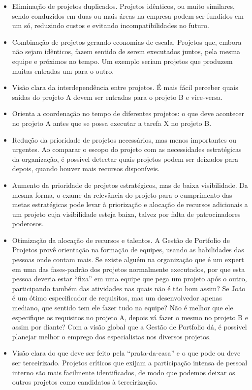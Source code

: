 \documentclass[12pt,a4paper,ruledheader,tocpage=prefix,floatnumber=continuous,pagestart=folhaderosto,font=times]{abnt}
\begin{document}
\begin{itemize}
 \item Eliminação de projetos duplicados. Projetos idênticos, ou muito similares, sendo conduzidos em duas ou mais áreas na empresa podem ser fundidos em um só, reduzindo custos e evitando incompatibilidades no futuro.
 \item Combinação de projetos gerando economias de escala. Projetos que, embora não sejam idênticos, fazem sentido de serem executados juntos, pela mesma equipe e próximos no tempo. Um exemplo seriam projetos que produzem muitas entradas um para o outro.
 \item Visão clara da interdependência entre projetos. É mais fácil perceber quais saídas do projeto A devem ser entradas para o projeto B e vice-versa.
 \item Orienta a coordenação no tempo de diferentes projetos: o que deve acontecer no projeto A antes que se possa executar a tarefa X no projeto B.
 \item Redução da prioridade de projetos necessários, mas menos importantes ou urgentes. Ao comparar o escopo do projeto com as necessidades estratégicas da organização, é possível detectar quais projetos podem ser deixados para depois, quando houver mais recursos disponíveis.
 \item Aumento da prioridade de projetos estratégicos, mas de baixa visibilidade. Da mesma forma, o exame da relevância do projeto para o cumprimento das metas estratégicas pode levar à priorização e alocação de recursos adicionais a um projeto cuja visibilidade esteja baixa, 
talvez por falta de patrocinadores poderosos.
 \item Otimização da alocação de recursos e talentos. A Gestão de Portfolio de Projetos provê orientação na formação de equipes, usando as habilidades das pessoas onde contam mais. Se existe alguém na organização que é um expert em uma das fases-padrão dos projetos normalmente 
executados, por que esta pessoa deveria estar “fixa” em uma equipe que pega um projeto após o outro, participando também das atividades nas quais não é tão bom assim? Se João é um ótimo especificador de requisitos, mas um desenvolvedor apenas mediano, que sentido tem ele fazer 
tudo na equipe? Não é melhor que ele especifique os requisitos no projeto A, depois vá fazer o mesmo no projeto B e assim por diante? Com a visão global que a Gestão de Portfolio dá, é possível planejar melhor o emprego dos especialistas nos diversos projetos.
 \item Visão clara do que deve ser feito pela “prata-da-casa” e o que pode ou deve ser terceirizado. Projetos críticos que exijam a participação intensa de pessoal interno são mais facilmente identificados, de modo que podemos deixar os outros projetos como candidatos à terceirização.

\end{itemize}
\end{document}
